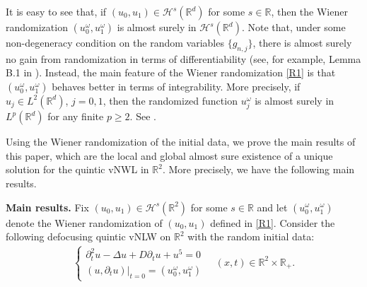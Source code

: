 \documentclass[letterpaper, 11pt,  reqno]{amsart}
\newcommand{\1}{\hspace{0.5mm}\text{I}\hspace{0.2mm}}
\newcommand{\R}{\mathbb{R}}
\newcommand{\Dl}{\Delta}
\newcommand{\dt}{\partial_t}
\renewcommand{\o}{\omega}
\renewcommand{\H}{\mathcal{H}}
\numberwithin{equation}{section}
\numberwithin{theorem}{section}
\begin{document}
It is easy to see that, if $(u_0,u_1) \in \H^s(\R^d)$
for some $s \in \R$,
then  the Wiener randomization $(u_0^\omega, u_1^\omega)$ is
almost surely  in $\H^s(\R^d)$.
Note that, under some non-degeneracy condition on the random variables $\{g_{n, j}\}$, 
 there is almost surely no gain from randomization
in terms of differentiability (see, for example, Lemma B.1 in \cite{BT1}).
Instead, the main feature of 
the Wiener randomization %
 \eqref{R1}
is that $(u_0^\omega, u_1^\omega)$  behaves better in terms of integrability.
More precisely, if $u_j \in L^2(\R^d)$, $j=0,1$,
then  the randomized function $u_j^\omega$ is
almost surely  in $L^p(\R^d)$ for any finite $p \geq 2$.
See \cite{BOP1}.

Using the Wiener randomization of the initial data, we prove the main results of this paper,
which are the local and global almost sure existence of a unique solution
for the quintic vNWL in $\R^2$.
More precisely, we have the following main results. 

{\bf{Main results.}}
Fix  $(u_0, u_1) \in \H^s(\R^2)$
for some $s \in \R$ and 
let $(u_0^\o, u_1^\o)$ denote the Wiener randomization
of $(u_0, u_1)$
defined in \eqref{R1}.
Consider the following defocusing quintic vNLW on $\R^2$
with the random initial data:
\begin{align}
\begin{cases}
\dt^2 u - \Dl  u  + D \dt u  + u^5 = 0\\
(u, \dt u) |_{t = 0} = (u_0^\o, u_1^\o)
\end{cases}
\quad (x, t) \in \R^2\times \R_+.
\label{NLW1}
\end{align}


\end{document}
